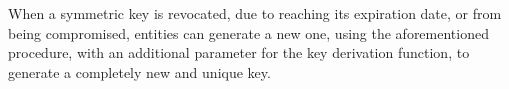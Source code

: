 
When a symmetric key is revocated, due to reaching its expiration date, or from being compromised, entities can generate a new one, using the aforementioned procedure, with an additional parameter for the key derivation function, to generate a completely new and unique key.
